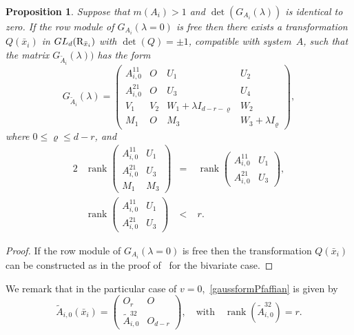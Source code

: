 \documentclass[final,1p,times,number,amsthm]{elsart}
\newtheorem{proposition}[lemma]{Proposition}
\begin{document}
\begin{proposition}
\label{gauss3Pfaffian}
Suppose that $m(A_{i}) >1$ and $\det(G_{A_{i}} (\lambda))$ is identical to
zero. If the row module of $G_{A_{i}} (\lambda =0)$ is free then there exists a
transformation $Q({\bar{x}_i})$ in $GL_d({\rm R}_{\bar{x}_i})$ with
$\det(Q) = \pm 1$, compatible with system~$A$, such that the matrix
$G_{\tilde{A}_{i}} (\lambda))$ has the form
\begin{equation} 
\label{particularform3Pfaffian} 
G_{\tilde{A}_{i}} (\lambda) = \left(\begin{matrix} A_{i,0}^{11} & O & U_1& U_2
\\[5pt] A_{i,0}^{21} & O & U_3 & U_4 \\[5pt] V_1 & V_2 & W_1 + \lambda I_{d- r
-\varrho} & W_2 \\[5pt] M_1 & O & M_3 & W_3 + \lambda
I_\varrho \end{matrix}\right) ,\end{equation} where $0 \leq \varrho \leq d-r$,
and
\begin{alignat}2
\label{particularconditionbPfaffian} 
  & \operatorname{rank}\left(\begin{matrix} A_{i,0}^{11} &U_1\\[5pt] A_{i,0}^{21} &
      U_3 \\[5pt] M_1& M_3 \end{matrix}\right) &=\; &
\operatorname{rank}\left(\begin{matrix} A_{i,0}^{11} & U_1\\[5pt] A_{i,0}^{21} &
U_3 \end{matrix}\right), \\[10pt] \label{particularconditionaPfaffian}
&\operatorname{rank} \left(\begin{matrix} A_{i,0}^{11} & U_1\\[5pt] A_{i,0}^{21} &
U_3 \end{matrix}\right) &<\; &r. 
\end{alignat}
\end{proposition}
\begin{proof}
  If the row module of $G_{A_{i}} (\lambda =0)$ is free then the transformation $Q ({\bar{x}_i})$ can be constructed as in the proof
  of~\cite[Proposition 3]{key101} for the bivariate case.
\end{proof}
\noindent We remark that in the particular case of
$v=0$,~\eqref{gaussformPfaffian} is given by
$$
\tilde{A}_{i,0} (\bar{x}_{i} ) = \left(\begin{matrix}
    O_{r}  & O \\[5pt]
    \tilde{A}_{i,0}^{32} & O_{d-r} \end{matrix}\right) , \quad \text{with} \quad
\operatorname{rank}(\tilde{A}_{i,0}^{32}) = r .$$
\end{document}
